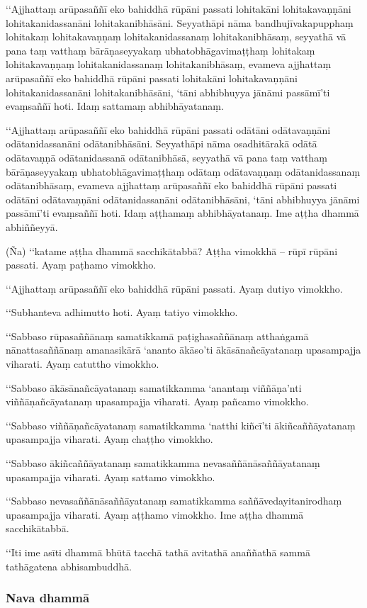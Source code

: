 ‘‘Ajjhattaṃ arūpasaññī eko bahiddhā rūpāni passati lohitakāni lohitakavaṇṇāni lohitakanidassanāni lohitakanibhāsāni. Seyyathāpi nāma bandhujīvakapupphaṃ lohitakaṃ lohitakavaṇṇaṃ lohitakanidassanaṃ lohitakanibhāsaṃ, seyyathā vā pana taṃ vatthaṃ bārāṇaseyyakaṃ ubhatobhāgavimaṭṭhaṃ lohitakaṃ lohitakavaṇṇaṃ lohitakanidassanaṃ lohitakanibhāsaṃ, evameva ajjhattaṃ arūpasaññī eko bahiddhā rūpāni passati lohitakāni lohitakavaṇṇāni lohitakanidassanāni lohitakanibhāsāni, ‘tāni abhibhuyya jānāmi passāmī’ti evaṃsaññī hoti. Idaṃ sattamaṃ abhibhāyatanaṃ.

‘‘Ajjhattaṃ arūpasaññī eko bahiddhā rūpāni passati odātāni odātavaṇṇāni odātanidassanāni odātanibhāsāni. Seyyathāpi nāma osadhitārakā odātā odātavaṇṇā odātanidassanā odātanibhāsā, seyyathā vā pana taṃ vatthaṃ bārāṇaseyyakaṃ ubhatobhāgavimaṭṭhaṃ odātaṃ odātavaṇṇaṃ odātanidassanaṃ odātanibhāsaṃ, evameva ajjhattaṃ arūpasaññī eko bahiddhā rūpāni passati odātāni odātavaṇṇāni odātanidassanāni odātanibhāsāni, ‘tāni abhibhuyya jānāmi passāmī’ti evaṃsaññī hoti. Idaṃ aṭṭhamaṃ abhibhāyatanaṃ. Ime aṭṭha dhammā abhiññeyyā.

(Ña) ‘‘katame aṭṭha dhammā sacchikātabbā? Aṭṭha vimokkhā – rūpī rūpāni passati. Ayaṃ paṭhamo vimokkho.

‘‘Ajjhattaṃ arūpasaññī eko bahiddhā rūpāni passati. Ayaṃ dutiyo vimokkho.

‘‘Subhanteva adhimutto hoti. Ayaṃ tatiyo vimokkho.

‘‘Sabbaso rūpasaññānaṃ samatikkamā paṭighasaññānaṃ atthaṅgamā nānattasaññānaṃ amanasikārā ‘ananto ākāso’ti ākāsānañcāyatanaṃ upasampajja viharati. Ayaṃ catuttho vimokkho.

‘‘Sabbaso ākāsānañcāyatanaṃ samatikkamma ‘anantaṃ viññāṇa’nti viññāṇañcāyatanaṃ upasampajja viharati. Ayaṃ pañcamo vimokkho.

‘‘Sabbaso viññāṇañcāyatanaṃ samatikkamma ‘natthi kiñcī’ti ākiñcaññāyatanaṃ upasampajja viharati. Ayaṃ chaṭṭho vimokkho.

‘‘Sabbaso ākiñcaññāyatanaṃ samatikkamma nevasaññānāsaññāyatanaṃ upasampajja viharati. Ayaṃ sattamo vimokkho.

‘‘Sabbaso nevasaññānāsaññāyatanaṃ samatikkamma saññāvedayitanirodhaṃ upasampajja viharati. Ayaṃ aṭṭhamo vimokkho. Ime aṭṭha dhammā sacchikātabbā.

‘‘Iti ime asīti dhammā bhūtā tacchā tathā avitathā anaññathā sammā tathāgatena abhisambuddhā.

\subsubsection{Nava dhammā}

